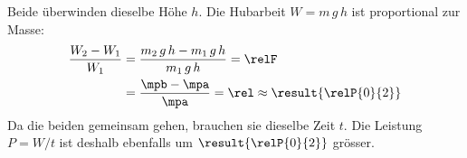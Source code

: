 Beide überwinden dieselbe Höhe $h$. Die Hubarbeit $W = m\,g\,h$ ist proportional zur Masse:
\begin{align}
 \frac{W_2-W_1}{W_1} &= \frac{m_2\,g\,h-m_1\,g\,h}{m_1\,g\,h} = \relF \\
   &= \frac{\mpb-\mpa}{\mpa} = \rel \approx \result{\relP{0}{2}}
\end{align}
Da die beiden gemeinsam gehen, brauchen sie dieselbe Zeit $t$. Die Leistung $P = W/t$ ist deshalb ebenfalls um $\result{\relP{0}{2}}$ grösser.
